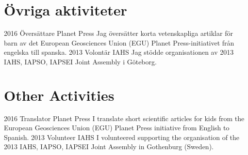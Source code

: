 \ifswedish
  \section{Övriga aktiviteter}
    \position
      {2016 \textemdash{}}
      {Översättare}
      {Planet Press}
      {Jag översätter korta vetenskapliga artiklar för barn av det European Geosciences Union (EGU) Planet Press-initiativet från engelska till spanska.}
    \position
      {2013}
      {Volontär}
      {IAHS}
      {Jag stödde organisationen av 2013 IAHS, IAPSO, IAPSEI Joint Assembly i Göteborg.}
\else
  \section{Other Activities}
    \position
      {2016 \textemdash{}}
      {Translator}
      {Planet Press}
      {I translate short scientific articles for kids from the European Geosciences Union (EGU) Planet Press initiative from English to Spanish.}
    \position
      {2013}
      {Volunteer}
      {IAHS}
      {I volunteered supporting the organisation of the 2013 IAHS, IAPSO, IAPSEI Joint Assembly in Gothenburg (Sweden).}
\fi
